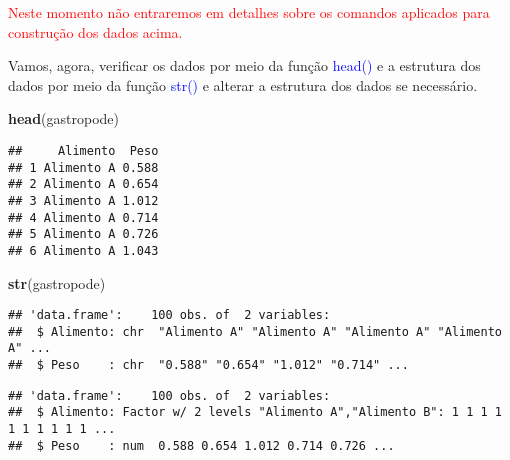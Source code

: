 \documentclass[14pt,titlepage, oneside, openany, a4paper]{book}
\newenvironment{Shaded}{\begin{snugshade}}{\end{snugshade}}
\newcommand{\KeywordTok}[1]{\textcolor[rgb]{0.13,0.29,0.53}{\textbf{#1}}}
\newcommand{\NormalTok}[1]{#1}
\newcommand{\OperatorTok}[1]{\textcolor[rgb]{0.81,0.36,0.00}{\textbf{#1}}}
\newcommand{\StringTok}[1]{\textcolor[rgb]{0.31,0.60,0.02}{#1}}
\begin{document}
\textcolor{red}{Neste momento não entraremos em detalhes sobre os comandos aplicados para construção dos dados acima.}

Vamos, agora, verificar os dados por meio da função \textcolor{blue}{head()} e a estrutura dos dados por meio da função \textcolor{blue}{str()} e alterar a estrutura dos dados se necessário.

\begin{Shaded}
\begin{Highlighting}[]
\KeywordTok{head}\NormalTok{(gastropode)}
\end{Highlighting}
\end{Shaded}

\begin{verbatim}
##     Alimento  Peso
## 1 Alimento A 0.588
## 2 Alimento A 0.654
## 3 Alimento A 1.012
## 4 Alimento A 0.714
## 5 Alimento A 0.726
## 6 Alimento A 1.043
\end{verbatim}

\begin{Shaded}
\begin{Highlighting}[]
\KeywordTok{str}\NormalTok{(gastropode)}
\end{Highlighting}
\end{Shaded}

\begin{verbatim}
## 'data.frame':    100 obs. of  2 variables:
##  $ Alimento: chr  "Alimento A" "Alimento A" "Alimento A" "Alimento A" ...
##  $ Peso    : chr  "0.588" "0.654" "1.012" "0.714" ...
\end{verbatim}

\begin{Shaded}
\end{Shaded}

\begin{verbatim}
## 'data.frame':    100 obs. of  2 variables:
##  $ Alimento: Factor w/ 2 levels "Alimento A","Alimento B": 1 1 1 1 1 1 1 1 1 1 ...
##  $ Peso    : num  0.588 0.654 1.012 0.714 0.726 ...
\end{verbatim}
\end{document}
